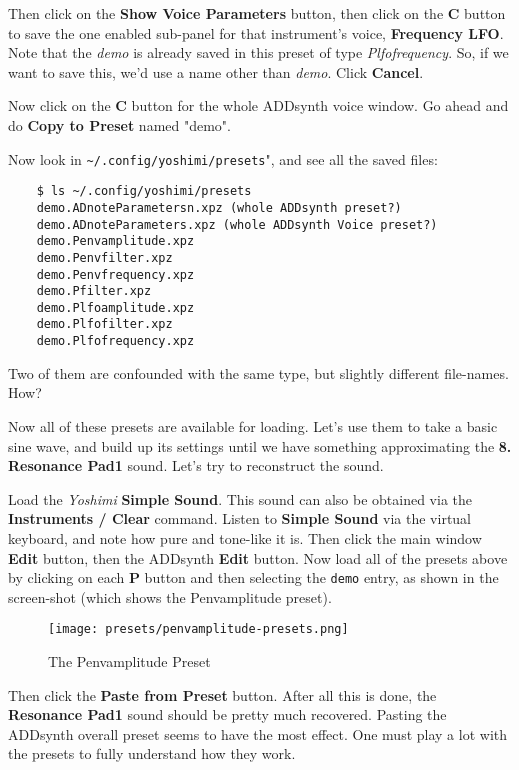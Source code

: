    Then click on the \textbf{Show Voice Parameters} button,
   then click on the \textbf{C} button to save the one enabled sub-panel
   for that instrument's voice, \textbf{Frequency LFO}.
   Note that the \textsl{demo} is already saved in this preset of
   type \textsl{Plfofrequency}.  So, if we want to save this, we'd use a
   name other than \textsl{demo}.  Click \textbf{Cancel}.

   Now click on the \textbf{C} button
   for the whole ADDsynth voice window.  Go ahead and do
   \textbf{Copy to Preset} named "demo".

   Now look in \texttt{\textasciitilde/.config/yoshimi/presets}",
   and see all the saved files:

\begin{verbatim}
	$ ls ~/.config/yoshimi/presets
	demo.ADnoteParametersn.xpz (whole ADDsynth preset?)
	demo.ADnoteParameters.xpz (whole ADDsynth Voice preset?)
	demo.Penvamplitude.xpz
	demo.Penvfilter.xpz
	demo.Penvfrequency.xpz
	demo.Pfilter.xpz
	demo.Plfoamplitude.xpz
	demo.Plfofilter.xpz
	demo.Plfofrequency.xpz
\end{verbatim}

	Two of them are confounded with the same type, but slightly
   different file-names.  How?

   Now all of these presets are available for loading.
   Let's use them to take a basic sine wave, and build up its settings until
   we have something approximating the \textbf{8. Resonance Pad1} sound.
   Let's try to reconstruct the sound.
   
   Load the \textsl{Yoshimi} \textbf{Simple Sound}. 
   This sound can also be obtained via the \textbf{Instruments / Clear}
   command.
   Listen to \textbf{Simple Sound} via the virtual keyboard, and note
   how pure and tone-like it is.
   Then click the main window \textbf{Edit} button, then the
   ADDsynth \textbf{Edit} button.
   Now load all of the presets above by clicking on each \textbf{P}
   button and then selecting the \texttt{demo} entry, 
   as shown in the screen-shot (which shows the Penvamplitude preset).

\begin{figure}[H]
   \centering 
   \texttt{[image: presets/penvamplitude-presets.png]}
   \caption{The Penvamplitude Preset}
   \label{fig:presets_penvamplitude}
\end{figure}

   Then click the \textbf{Paste from Preset} button.
   After all this is done, the
   \textbf{Resonance Pad1} sound should 
   be pretty much recovered.
   Pasting the ADDsynth overall preset seems to have the most effect.
   One must play a lot with the presets to fully understand how they work.

